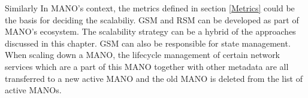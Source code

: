 Similarly In MANO's context, the metrics defined in section \ref{Metrics} could be the basis for deciding the scalabiliy. GSM and RSM can be developed as part of MANO's ecosystem. The scalability strategy can be a hybrid of the approaches discussed in this chapter.
GSM can also be responsible for state management. When scaling down a MANO, the lifecycle management of certain network services which are a part of this MANO together with other metadata are all transferred to a new active  MANO and the old MANO is deleted from the list of active MANOs.


 
 
